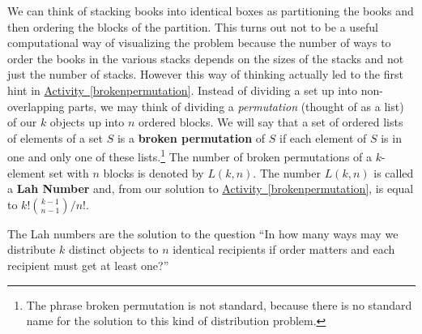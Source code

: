 \documentclass[10pt,]{book}
\newcommand{\terminology}[1]{\textbf{#1}}
\theoremstyle{plain}
\theoremstyle{definition}
\theoremstyle{definition}
\theoremstyle{definition}
\numberwithin{equation}{chapter}
\begin{document}
We can think of stacking books into identical boxes as partitioning the books and then ordering the blocks of the partition. This turns out not to be a useful computational way of visualizing the problem because the number of ways to order the books in the various stacks depends on the sizes of the stacks and not just the number of stacks. However this way of thinking actually led to the first hint in \hyperref[brokenpermutation]{Activity~\ref{brokenpermutation}}. Instead of dividing a set up into non-overlapping parts, we may think of dividing a \emph{permutation} (thought of as a list) of our \(k\) objects up into \(n\) ordered blocks. We will say that a set of ordered lists of elements of a set \(S\) is a \terminology{broken permutation}   of \(S\) if each element of \(S\) is in one and only one of these lists.\footnote{The phrase broken permutation is not standard, because there is no standard name for the solution to this kind  of distribution problem.\label{fn-11}} The number of broken permutations of a \(k\)-element set with \(n\) blocks is denoted by \(L(k,n)\). The number \(L(k,n)\) is called a \terminology{Lah Number} and, from our solution to \hyperref[brokenpermutation]{Activity~\ref{brokenpermutation}}, is equal to \(k!\binom{k-1}{n-1}/n!\).%
\par
\hypertarget{p-880}{}%
The Lah numbers are the solution to the question ``In how many ways may we distribute \(k\) distinct objects to \(n\) identical recipients if order matters and each recipient must get at least one?''%
\typeout{************************************************}
\typeout{************************************************}
\end{document}
